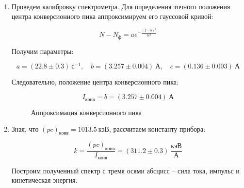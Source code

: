 \documentclass[14pt, a4paper]{report}
\begin{document}
\begin{enumerate}

\item Проведем калибровку спектрометра. Для определения точного положения центра конверсионного пика аппроксимируем его гауссовой кривой:

\[N-N_{ф}=ae^{-\frac{(I-b)^2}{2c^2}}\]

Получим параметры:

\[a=(22.8\pm0.3)\ с^{-1},\quad b=(3.257\pm0.004)\ А,\quad c=(0.136\pm0.003)\ А\]

Следовательно, положение центра конверсионного пика:

\[I_{конв}=b=(3.257\pm0.004)\ А\]

\begin{figure}[H]
\centering
{}
\caption{Аппроксимация конверсионного пика}
\end{figure}

\item Зная, что $(pc)_{конв}=1013.5\ кэВ$, рассчитаем константу прибора:

\[k=\frac{(pc)_{конв}}{I_{конв}}=(311.2\pm0.3)\ \frac{кэВ}{А}\]

Построим полученный спектр с тремя осями абсцисс -- сила тока, импульс и кинетическая энергия.


\end{enumerate}
\end{document}
